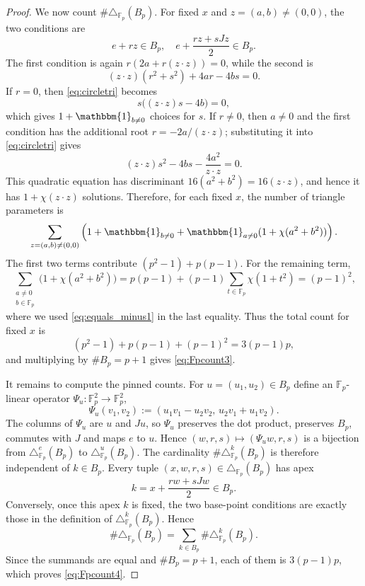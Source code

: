 \documentclass[10pt,a4paper]{amsart}
\numberwithin{equation}{section}
\begin{document}
\begin{proof}
We now count $\#\triangle_{\mathbb{F}_p}(B_p)$. For fixed $x$ and $z=(a,b)\neq(0,0)$, the two conditions are
\[ e+rz\in B_p, \quad e+\frac{rz+sJz}{2}\in B_p. \]
The first condition is again $r(2a+r(z\cdot z))=0$, while the second is
\begin{equation}\label{eq:circletri}
(z\cdot z)(r^2+s^2)+4ar-4bs=0.
\end{equation}
If $r=0$, then \eqref{eq:circletri} becomes
\[ s\bigl((z\cdot z)s-4b\bigr)=0, \]
which gives $1+\mathbbm{1}_{b\ne0}$ choices for $s$. If $r\neq 0$, then $a\neq 0$ and the first condition has the additional root $r=-2a/(z\cdot z)$; substituting it into \eqref{eq:circletri} gives
\[ (z\cdot z)s^2-4bs-\frac{4a^2}{z\cdot z}=0. \]
This quadratic equation has discriminant $16(a^2+b^2)=16(z\cdot z)$, and hence it has $1+\chi(z\cdot z)$ solutions. Therefore, for each fixed $x$, the number of triangle parameters is
\[ \sum_{z=(a,b)\neq(0,0)} \left(1+\mathbbm{1}_{b\ne0} + \mathbbm{1}_{a\ne0}(1+\chi(a^2+b^2))\right). \]
The first two terms contribute $(p^2-1)+p(p-1)$. For the remaining term,
\[ \sum_{\substack{a\ne0\\ b\in\mathbb{F}_p}} \bigl(1+\chi(a^2+b^2)\bigr)
= p(p-1)+(p-1)\sum_{t\in\mathbb{F}_p}\chi(1+t^2) = (p-1)^2, \]
where we used \eqref{eq:equals_minus1} in the last equality.
Thus the total count for fixed $x$ is
\[ (p^2-1)+p(p-1)+(p-1)^2=3(p-1)p, \]
and multiplying by $\#B_p=p+1$ gives \eqref{eq:Fpcount3}.

It remains to compute the pinned counts. For $u=(u_1,u_2)\in B_p$ define an $\mathbb{F}_p$-linear operator $\Psi_u\colon\mathbb{F}_p^2\to\mathbb{F}_p^2$,
\[ \Psi_u(v_1,v_2):=(u_1v_1-u_2v_2,\,u_2v_1+u_1v_2). \]
The columns of $\Psi_u$ are $u$ and $Ju$, so $\Psi_u$ preserves the dot product, preserves $B_p$, commutes with $J$ and maps $e$ to $u$. Hence $(w,r,s)\mapsto(\Psi_u w,r,s)$ is a bijection from $\triangle^e_{\mathbb{F}_p}(B_p)$ to $\triangle^u_{\mathbb{F}_p}(B_p)$. The cardinality $\#\triangle^k_{\mathbb{F}_p}(B_p)$ is therefore independent of $k\in B_p$.
Every tuple $(x,w,r,s)\in\triangle_{\mathbb{F}_p}(B_p)$ has apex
\[ k=x+\frac{rw+sJw}{2}\in B_p. \]
Conversely, once this apex $k$ is fixed, the two base-point conditions are exactly those in the definition of $\triangle^k_{\mathbb{F}_p}(B_p)$. Hence
\[ \#\triangle_{\mathbb{F}_p}(B_p) = \sum_{k\in B_p}\#\triangle^k_{\mathbb{F}_p}(B_p). \]
Since the summands are equal and $\#B_p=p+1$, each of them is $3(p-1)p$, which proves \eqref{eq:Fpcount4}.
\end{proof}
\end{document}
